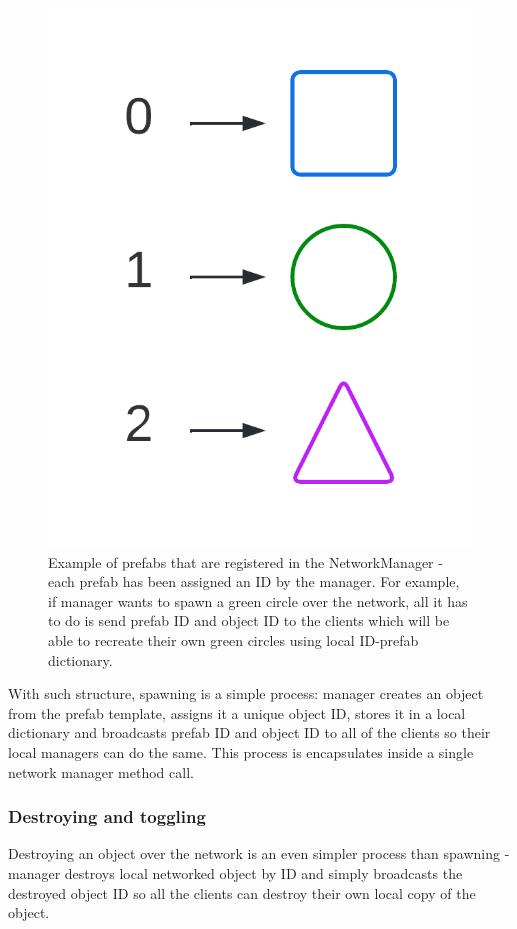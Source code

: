 \documentclass[times, utf8, diplomski]{fer}
\begin{document}
\begin{figure}[H]
	\centering
	\includegraphics[scale=0.3]{NetworkManager-prefabs}
	\caption{Example of prefabs that are registered in the NetworkManager - each prefab has been assigned an ID by the manager. For example, if manager wants to spawn a green circle over the network, all it has to do is send prefab ID and object ID to the clients which will be able to recreate their own green circles using local ID-prefab dictionary.}
	\label{fig:network-manager-prefabs}
\end{figure}

With such structure, spawning is a simple process: manager creates an object from the prefab template, assigns it a unique object ID, stores it in a local dictionary and broadcasts prefab ID and object ID to all of the clients so their local managers can do the same. This process is encapsulates inside a single network manager method call.

\subsubsection{Destroying and toggling}
Destroying an object over the network is an even simpler process than spawning - manager destroys local networked object by ID and simply broadcasts the destroyed object ID so all the clients can destroy their own local copy of the object. \\
\end{document}
